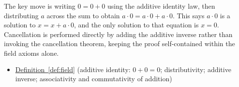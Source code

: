 \begin{remark*}
The key move is writing $0 = 0 + 0$ using the additive identity law, then
distributing $a$ across the sum to obtain $a\cdot 0 = a\cdot 0 + a\cdot 0$.
This says $a\cdot 0$ is a solution to $x = x + a\cdot 0$, and the only
solution to that equation is $x = 0$.  Cancellation is performed directly
by adding the additive inverse rather than invoking the cancellation theorem,
keeping the proof self-contained within the field axioms alone.
\end{remark*}

\begin{dependencies}
\begin{itemize}
  \item \hyperref[def:field]{Definition~\ref*{def:field}}
        \textnormal{(additive identity: $0+0=0$; distributivity; additive inverse;
        associativity and commutativity of addition)}
\end{itemize}
\end{dependencies}
